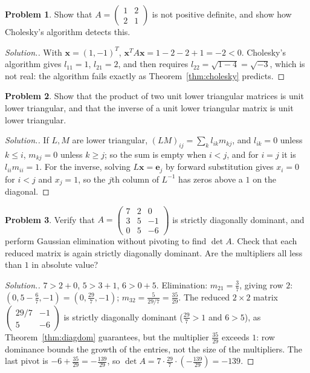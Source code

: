 \documentclass[11pt,a4paper]{article}
\numberwithin{equation}{section}
\theoremstyle{definition}
\newtheorem{problemx}{Problem}[subsection]
\newenvironment{problem}{\begin{problemx}}{\end{problemx}}
\newenvironment{solution}
  {\renewcommand{\qedsymbol}{}\begin{proof}[\textit{Solution}.]}
  {\end{proof}}
\begin{document}
\begin{problem}
Show that $A = \begin{pmatrix}1&2\\2&1\end{pmatrix}$ is not positive definite, and show how Cholesky's algorithm detects this.
\end{problem}
\begin{solution}
With $\mathbf x = (1,-1)^T$, $\mathbf x^TA\mathbf x = 1-2-2+1 = -2<0$. Cholesky's algorithm gives $l_{11} = 1$, $l_{21} = 2$, and then requires
$l_{22} = \sqrt{1-4} = \sqrt{-3}$, which is not real: the algorithm fails exactly as Theorem~\ref{thm:cholesky} predicts.
\end{solution}

\begin{problem}
Show that the product of two unit lower triangular matrices is unit lower triangular, and that the inverse of a unit lower triangular
matrix is unit lower triangular.
\end{problem}
\begin{solution}
If $L, M$ are lower triangular, $(LM)_{ij} = \sum_kl_{ik}m_{kj}$, and $l_{ik} = 0$ unless $k\leq i$, $m_{kj} = 0$ unless $k\geq j$; so the sum is
empty when $i<j$, and for $i = j$ it is $l_{ii}m_{ii} = 1$. For the inverse, solving $L\mathbf x = \mathbf e_j$ by forward substitution gives
$x_i = 0$ for $i<j$ and $x_j = 1$, so the $j$th column of $L^{-1}$ has zeros above a $1$ on the diagonal.
\end{solution}

\begin{problem}
\label{prob:dd}
Verify that $A = \begin{pmatrix}7&2&0\\3&5&-1\\0&5&-6\end{pmatrix}$ is strictly diagonally dominant, and perform Gaussian elimination
without pivoting to find $\det A$. Check that each reduced matrix is again strictly diagonally dominant. Are the multipliers all less
than $1$ in absolute value?
\end{problem}
\begin{solution}
$7>2+0$, $5>3+1$, $6>0+5$. Elimination: $m_{21} = \frac37$, giving row $2$: $(0, 5-\frac67, -1) = (0,\frac{29}{7},-1)$; $m_{32} = \frac{5}{29/7} = \frac{35}{29}$.
The reduced $2\times2$ matrix $\begin{pmatrix}29/7&-1\\5&-6\end{pmatrix}$ is strictly diagonally dominant ($\frac{29}{7}>1$ and $6>5$), as
Theorem~\ref{thm:diagdom} guarantees, but the multiplier $\frac{35}{29}$ exceeds $1$: row dominance bounds the growth of the entries, not
the size of the multipliers. The last pivot is $-6+\frac{35}{29} = -\frac{139}{29}$, so $\det A = 7\cdot\frac{29}{7}\cdot\left(-\frac{139}{29}\right) = -139$.
\end{solution}
\end{document}

